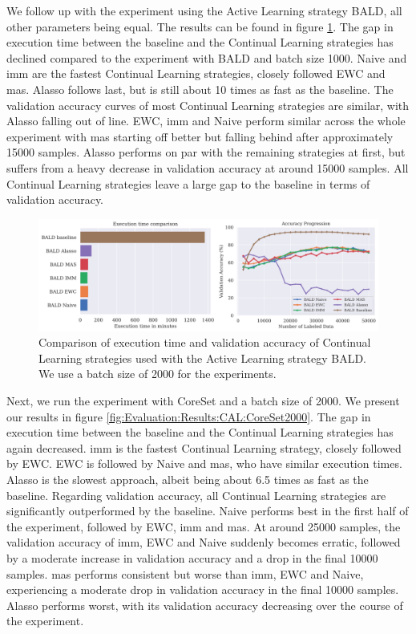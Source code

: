 We follow up with the experiment using the Active Learning strategy BALD, all other parameters being equal. The results can be found in figure \ref{fig:Evaluation:Results:CAL:BALD2000}. The gap in
execution time between the baseline and the Continual Learning strategies has declined compared to the experiment with BALD and batch size 1000. Naive and \gls{imm} are the fastest Continual Learning strategies,
closely followed EWC and \gls{mas}. Alasso follows last, but is still about 10 times as fast as the baseline. The validation accuracy curves of most Continual Learning strategies are similar, with Alasso falling 
out of line. EWC, \gls{imm} and Naive perform similar across the whole experiment with \gls{mas} starting off better but falling behind after approximately 15000 samples. Alasso performs on par with the remaining strategies
at first, but suffers from a heavy decrease in validation accuracy at around 15000 samples. All Continual Learning strategies leave a large gap to the baseline in terms of validation accuracy. \par

\begin{figure}[h]
    \centering
    \includegraphics[width=\linewidth]{images/results_CAL/Bald_CAL_2000b.png}
    \caption[Continual Active Learning BALD 2000 batch size]{Comparison of execution time and validation accuracy of Continual Learning strategies used with the Active Learning strategy
    BALD. We use a batch size of 2000 for the experiments.}
    \label{fig:Evaluation:Results:CAL:BALD2000}
\end{figure}

Next, we run the experiment with CoreSet and a batch size of 2000. We present our results in figure \ref{fig:Evaluation:Results:CAL:CoreSet2000}. The gap in execution time between the baseline and the
Continual Learning strategies has again decreased. \gls{imm} is the fastest Continual Learning strategy, closely followed by EWC. EWC is followed by Naive and \gls{mas}, who have similar execution times. Alasso is
the slowest approach, albeit being about 6.5 times as fast as the baseline. Regarding validation accuracy, all Continual Learning strategies are significantly outperformed by the baseline. Naive performs best
in the first half of the experiment, followed by EWC, \gls{imm} and \gls{mas}. At around 25000 samples, the validation accuracy of \gls{imm}, EWC and Naive suddenly becomes erratic, followed by a moderate increase in validation
accuracy and a drop in the final 10000 samples. \gls{mas} performs consistent but worse than \gls{imm}, EWC and Naive, experiencing a moderate drop in validation accuracy in the final 10000 samples. Alasso performs worst,
with its validation accuracy decreasing over the course of the experiment. \par

